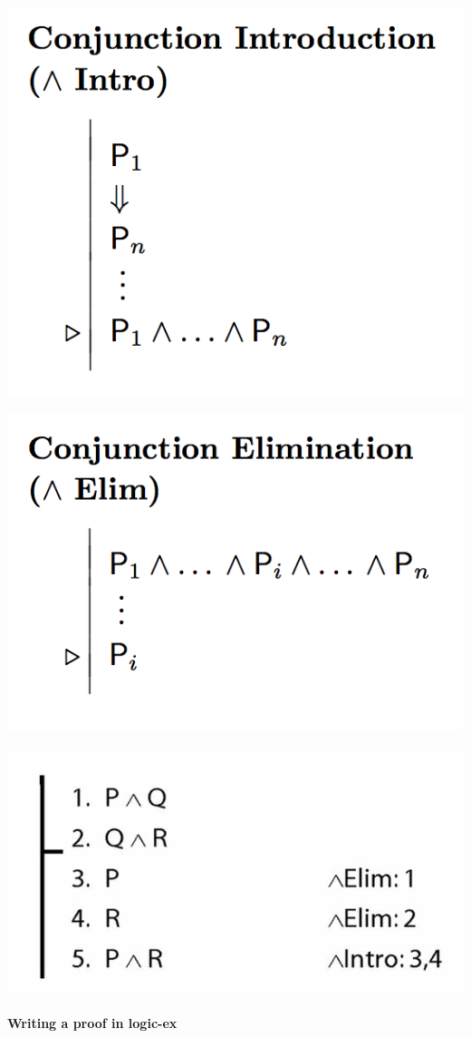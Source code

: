 \documentclass[12pt]{extarticle}
\begin{document}
\begin{multicols*}{3}
\begin{center}
\includegraphics[scale=0.3]{img/rule_conjunction_intro.png}
\end{center}
\begin{center}
\includegraphics[scale=0.3]{img/rule_conjunction_elim.png}
\end{center}
\begin{center}
\includegraphics[scale=0.3]{img/proof_unit_21.png}
\end{center}
\textbf{Writing a proof in logic-ex}
 

\end{multicols*}
\end{document}
